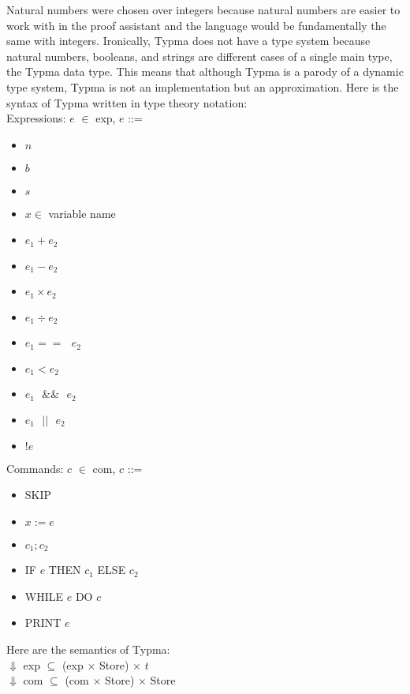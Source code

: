 \documentclass[10pt,twocolumn]{article}
\begin{document}
 Natural numbers were chosen over integers because natural numbers are easier to work with in the proof assistant and the language would be fundamentally the same with integers. Ironically, Typma does not have a type system because natural numbers, booleans, and strings are different cases of a single main type, the Typma data type. This means that although Typma is a parody of a dynamic type system, Typma is not an implementation but an approximation. Here is the syntax of Typma written in type theory notation:
\\

Expressions: $e$ $\in$ exp, $e$ ::=
\begin{itemize}
  \item $n$
  \item $b$
  \item $s$
  \item $x \in$ variable name
  \item $e_1 + e_2$
  \item $e_1 - e_2$
  \item $e_1 \times e_2$
  \item $e_1 \div e_2 $
  \item $e_1 == \text{ }e_2$
  \item $e_1 < e_2$
  \item $e_1\text{ } \&\& \text{ } e_2$
  \item $e_1\text{ } ||\text{ } e_2 $
  \item $!e$
 \end{itemize}

Commands: $c$ $\in$ com, $c$ ::=
\begin{itemize}
  \item SKIP
  \item $x := e$
  \item $c_1; c_2$
  \item IF $e$ THEN $c_1$ ELSE $c_2$
  \item WHILE $e$ DO $c$
  \item PRINT $e$
 \end{itemize}
 
 Here are the semantics of Typma:\\
 $\Downarrow$ exp $\subseteq$  (exp $\times$ Store)  $\times$ $t$\\
 $\Downarrow$ com $\subseteq$  (com $\times$ Store)  $\times$ Store\\
 
\end{document}
